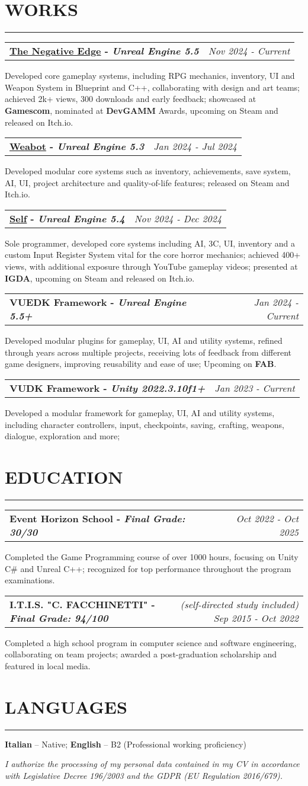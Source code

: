 \documentclass[7pt]{article}
\makeatletter
\newcommand{\sectionline}{\vspace{-0.3em}\noindent\rule{\linewidth}{0.15pt}\vspace{0.08em}}
\newcommand{\project}[3]{%
    \noindent
    \begin{tabular*}{\textwidth}{@{\extracolsep{\fill}} l r}
    \textbf{#1} & \textit{#2} \\
    \end{tabular*}
    \vspace{0.04em}
    #3
    \vspace{0.08em}\par
}
\newcommand{\cvsection}[2]{%
    \vspace{-.6em}
    \section*{{\large\textbf{\MakeUppercase{#1}}}}
    \vspace{-0.5em}
    \sectionline
    \vspace{-0.15em}
    #2
}
\newcommand{\footerdescription}[1]{%
    \vspace{-0.25em}
    \begin{center}
    \scriptsize
    \setlength{\parskip}{0pt}
    \setlength{\parindent}{0pt}
    \textit{#1}
    \end{center}
    \vspace{-0.25em}
}
\makeatother
\begin{document}
    \cvsection{WORKS}{
        \project{\href{https://eventhorizonschool.itch.io/the-negative-edge}{The Negative Edge} - \textit{Unreal Engine 5.5}}{Nov 2024 - Current}{
            Developed core gameplay systems, including RPG mechanics, inventory, UI and Weapon System in Blueprint and C++, collaborating with design and art teams;
            achieved 2k+ views, 300 downloads and early feedback;
            showcased at \textbf{Gamescom}, nominated at \textbf{DevGAMM} Awards, upcoming on Steam and released on Itch.io.
        }
        \project{\href{https://store.steampowered.com/app/4075260/Weabot/}{Weabot} - \textit{Unreal Engine 5.3}}{Jan 2024 - Jul 2024}{
            Developed modular core systems such as inventory, achievements, save system, AI, UI, project architecture and quality-of-life features;
            released on Steam and Itch.io.
        }
        \project{\href{https://jacedxxm.itch.io/self}{Self} - \textit{Unreal Engine 5.4}}{Nov 2024 - Dec 2024}{
            Sole programmer, developed core systems including AI, 3C, UI, inventory and a custom Input Register System vital for the core horror mechanics;
            achieved 400+ views, with additional exposure through YouTube gameplay videos; presented at \textbf{IGDA}, upcoming on Steam and released on Itch.io.
        }
        \project{VUEDK Framework - \textit{Unreal Engine 5.5+}}{Jan 2024 - Current}{
            Developed modular plugins for gameplay, UI, AI and utility systems, refined through years across multiple projects,
            receiving lots of feedback from different game designers, improving reusability and ease of use; Upcoming on \textbf{FAB}.
        }
        \project{VUDK Framework - \textit{Unity 2022.3.10f1+}}{Jan 2023 - Current}{
            Developed a modular framework for gameplay, UI, AI and utility systems, including character controllers, input, checkpoints, saving, crafting, weapons, dialogue, exploration and more;
        }
    }

    \cvsection{EDUCATION}{
        \project{Event Horizon School - \textit{Final Grade: 30/30}}{Oct 2022 - Oct 2025}{
            Completed the Game Programming course of over 1000 hours, focusing on Unity C\# and Unreal C++;
            recognized for top performance throughout the program examinations.
        }
        \project{I.T.I.S. "C. FACCHINETTI" - \textit{Final Grade: 94/100}}{(self-directed study included) Sep 2015 - Oct 2022}{
            Completed a high school program in computer science and software engineering, collaborating on team projects;
            awarded a post-graduation scholarship and featured in local media.
        }
    }

    \cvsection{LANGUAGES}{
        \textbf{Italian} – Native; \textbf{English} – B2 (Professional working proficiency)
    }

    \footerdescription{
        I authorize the processing of my personal data contained in my CV in accordance with Legislative Decree 196/2003 and the GDPR (EU Regulation 2016/679).
    }
\end{document}
